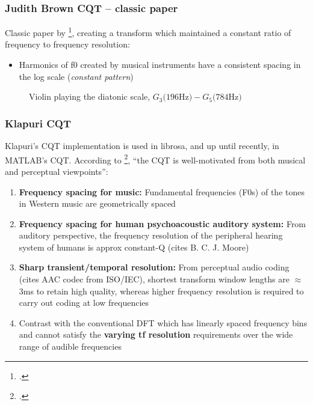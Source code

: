 \documentclass[usenames,dvipsnames]{beamer}
\begin{document}
\begin{frame}
	\frametitle{Judith Brown CQT -- classic paper}
	Classic paper by \footcite{jbrown}, creating a transform which maintained a constant ratio of frequency to frequency resolution:
\begin{itemize}
	\item
		Harmonics of f0 created by musical instruments have a consistent spacing in the log scale (\textit{constant pattern})
	\end{itemize}
	\begin{figure}[ht]
		\vspace{-0.75em}
		\centering
		\hspace{0.5em}
		\caption{Violin playing the diatonic scale, $G_{3} \text{(196Hz)} - G_{5} \text{(784Hz)}$}
	\end{figure}
\end{frame}

\begin{frame}
	\frametitle{Klapuri CQT}
	Klapuri's CQT implementation is used in librosa, and up until recently, in MATLAB's CQT. According to \footcite{klapuricqt}, ``the CQT is well-motivated from both musical and perceptual viewpoints'':
	\begin{enumerate}
		\item
			\textbf{Frequency spacing for music:} Fundamental frequencies (F0s) of the tones in Western music are geometrically spaced
		 \item
			 \textbf{Frequency spacing for human psychoacoustic auditory system:} From auditory perspective, the frequency resolution of the peripheral hearing system of humans is approx constant-Q (cites B. C. J. Moore)
		 \item
			 \textbf{Sharp transient/temporal resolution:} From perceptual audio coding (cites AAC codec from ISO/IEC), shortest transform window lengths are $\approx$ 3ms to retain high quality, whereas higher frequency resolution is required to carry out coding at low frequencies
		\item
			Contrast with the conventional DFT which has linearly spaced frequency bins and cannot satisfy the \textbf{varying tf resolution} requirements over the wide range of audible frequencies
	\end{enumerate}
\end{frame}
\end{document}
